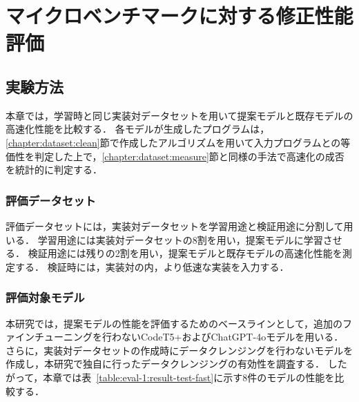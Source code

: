 \documentclass[11pt]{jreport}
\begin{document}


\chapter{マイクロベンチマークに対する修正性能評価}\label{chapter:eval-1}




\section{実験方法}


本章では，学習時と同じ実装対データセットを用いて提案モデルと既存モデルの高速化性能を比較する．
各モデルが生成したプログラムは，\ref{chapter:dataset:clean}節で作成したアルゴリズムを用いて入力プログラムとの等価性を判定した上で，\ref{chapter:dataset:measure}節と同様の手法で高速化の成否を統計的に判定する．




\subsection{評価データセット}


評価データセットには，実装対データセットを学習用途と検証用途に分割して用いる．
学習用途には実装対データセットの8割を用い，提案モデルに学習させる．
検証用途には残りの2割を用い，提案モデルと既存モデルの高速化性能を測定する．
検証時には，実装対の内，より低速な実装を入力する．




\subsection{評価対象モデル}


本研究では，提案モデルの性能を評価するためのベースラインとして，追加のファインチューニングを行わないCodeT5+およびChatGPT-4oモデルを用いる．
さらに，実装対データセットの作成時にデータクレンジングを行わないモデルを作成し，本研究で独自に行ったデータクレンジングの有効性を調査する．
したがって，本章では表~\ref{table:eval-1:result-test-fast}に示す8件のモデルの性能を比較する．
\end{document}
